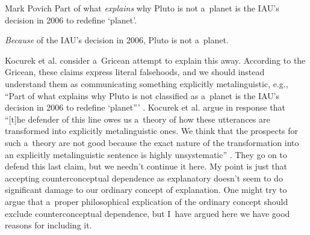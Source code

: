 \begin{artengenv}{Mark Povich}
Part of what \textit{explains} why Pluto is not a~planet is the IAU's decision in 2006 to redefine ‘planet'.

\textit{Because} of the IAU's decision in 2006, Pluto is not a~planet.
\parencite[][my emphasis]{kocurek_against_2020}%


Kocurek et al. consider a~Gricean attempt to explain this away. According to the Gricean, these claims express literal falsehoods, and we should instead understand them as communicating something explicitly metalinguistic, e.g., ``Part of what explains why Pluto is not classified as a~planet is the IAU's decision in 2006 to redefine ‘planet'''
\parencite*[][p.7]{kocurek_against_2020}. %
 Kocurek et al. argue in response that ``[t]he defender of this line owes us a~theory of how these utterances are transformed into explicitly metalinguistic ones. We think that the prospects for such a~theory are not good because the exact nature of the transformation into an explicitly metalinguistic sentence is highly unsystematic'' 
\parencite*[][p.7]{kocurek_against_2020}. %
 They go on to defend this last claim, but we needn't continue it here. My point is just that accepting counterconceptual dependence as explanatory doesn't seem to do significant damage to our ordinary concept of explanation. One might try to argue that a~proper philosophical explication of the ordinary concept should exclude counterconceptual dependence, but I~have argued here we have good reasons for including it.


\end{artengenv}
